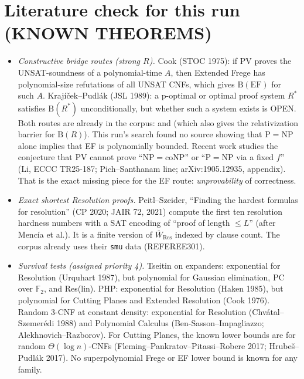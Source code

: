 \documentclass[11pt]{article}
\begin{document}
\section{Literature check for this run (KNOWN THEOREMS)}
\begin{itemize}
\item \emph{Constructive bridge routes (strong $R$).} Cook (STOC 1975): if PV proves
the UNSAT-soundness of a polynomial-time $A$, then Extended Frege has
polynomial-size refutations of all UNSAT CNFs, which gives $\mathrm B(\mathrm{EF})$
for such $A$. Krajíček--Pudlák (JSL 1989): a p-optimal or optimal proof system
$R^\ast$ satisfies $\mathrm B(R^\ast)$ unconditionally, but whether such a system
exists is OPEN. Both routes are already in the corpus:
and 
(which also gives the relativization barrier for $\mathrm B(R)$).
This run's search found no source showing that $\mathrm P=\mathrm{NP}$ alone
implies that EF is polynomially bounded. Recent work studies the conjecture
that PV cannot prove ``$\mathrm{NP}=\mathrm{coNP}$'' or ``$\mathrm P=\mathrm{NP}$
via a fixed $f$'' (Li, ECCC TR25-187; Pich--Santhanam line; arXiv:1905.12935, appendix).
That is the exact missing piece for the EF route: \emph{unprovability} of correctness.
\item \emph{Exact shortest Resolution proofs.} Peitl--Szeider, ``Finding the
hardest formulas for resolution'' (CP 2020; JAIR 72, 2021) compute the first ten
resolution hardness numbers with a SAT encoding of ``proof of length $\le L$''
(after Mencía et al.). It is a finite version of $\overline W_{\mathrm{Res}}$
indexed by clause count. The corpus already uses their \texttt{smu} data (REFEREE301).
\item \emph{Survival tests (assigned priority 4).} Tseitin on expanders: exponential
for Resolution (Urquhart 1987), but polynomial for Gaussian elimination,
PC over $\mathbb F_2$, and Res(lin). PHP: exponential for Resolution (Haken 1985),
but polynomial for Cutting Planes and Extended Resolution (Cook 1976).
Random 3-CNF at constant density: exponential for Resolution (Chvátal--Szemerédi 1988)
and Polynomial Calculus (Ben-Sasson--Impagliazzo; Alekhnovich--Razborov). For Cutting
Planes, the known lower bounds are for random $\Theta(\log n)$-CNFs
(Fleming--Pankratov--Pitassi--Robere 2017; Hrubeš--Pudlák 2017). No superpolynomial
Frege or EF lower bound is known for any family.
\end{itemize}
\end{document}
